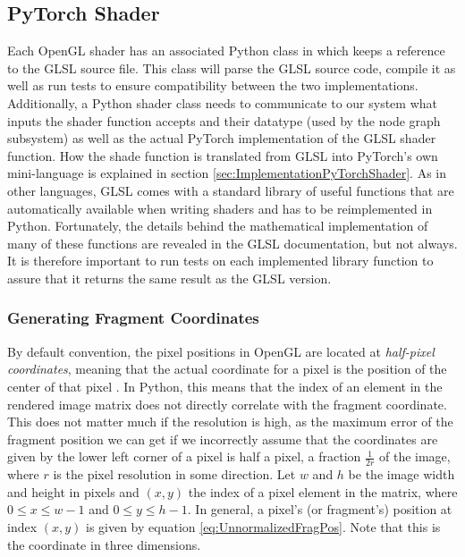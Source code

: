 \subsection{PyTorch Shader}

Each OpenGL shader has an associated Python class in \dipter{} which keeps a reference to the GLSL source file. This class will parse the GLSL source code, compile it as well as run tests to ensure compatibility between the two implementations. Additionally, a Python shader class needs to communicate to our system what inputs the shader function accepts and their datatype (used by the node graph subsystem) as well as the actual PyTorch implementation of the GLSL shader function. How the shade function is translated from GLSL into PyTorch's own mini-language is explained in section \ref{sec:ImplementationPyTorchShader}. As in other languages, GLSL comes with a standard library of useful functions that are automatically available when writing shaders and has to be reimplemented in Python. Fortunately, the details behind the mathematical implementation of many of these functions are revealed in the GLSL documentation, but not always. It is therefore important to run tests on each implemented library function to assure that it returns the same result as the GLSL version.

\subsubsection{Generating Fragment Coordinates}

By default convention, the pixel positions in OpenGL are located at \textit{half-pixel coordinates}, meaning that the actual coordinate for a pixel is the position of the center of that pixel \cite{segal_2013_the}. In Python, this means that the index of an element in the rendered image matrix does not directly correlate with the fragment coordinate. This does not matter much if the resolution is high, as the maximum error of the fragment position we can get if we incorrectly assume that the coordinates are given by the lower left corner of a pixel is half a pixel, a fraction $\frac{1}{2r}$ of the image, where $r$ is the pixel resolution in some direction. Let $w$ and $h$ be the image width and height in pixels and $(x,y)$ the index of a pixel element in the matrix, where $0 \leq x \leq w-1$ and $0\leq y \leq h-1$. In general, a pixel's (or fragment's) position at index $(x,y)$ is given by equation \ref{eq:UnnormalizedFragPos}. Note that this is the coordinate in three dimensions.

